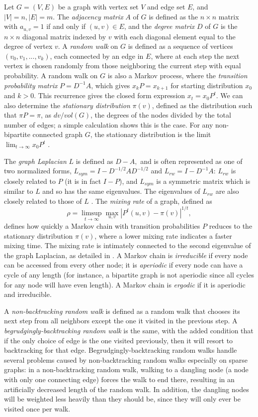 \documentclass{article} %
\begin{document}
Let $G = (V,E)$ be a graph with vertex set $V$ and edge set $E$, and $|V| = n, |E| = m$. The \emph{adjacency matrix} $A$ of $G$ is defined as the $n\times n$ matrix with $a_{u,v} = 1$ if and only if $(u,v)\in E$, and the \emph{degree matrix} $D$ of $G$ is the $n \times n$ diagonal matrix indexed by $v$ with each diagonal element equal to the degree of vertex $v$. A \emph{random walk} on $G$ is defined as a sequence of vertices $(v_0,v_1,...,v_k)$, each connected by an edge in $E$, where at each step the next vertex is chosen randomly from those neighboring the current step with equal probability. A random walk on $G$ is also a Markov process, where the \emph{transition probability matrix} $P = D^{-1}A$, which gives $x_kP = x_{k+1}$ for starting distribution $x_0$ and $k>0$. This recurrence gives the closed form expression $x_t = x_0P^t$. We can also determine the \emph{stationary distribution} $\pi(v)$, defined as the distribution such that $\pi P = \pi$, as $dv/vol(G)$, the degrees of the nodes divided by the total number of edges; a simple calculation shows this is the case. For any non-bipartite connected graph $G$, the stationary distribution is the limit $\displaystyle\lim_{t\rightarrow\infty}{x_0P^t}$ \cite{Lovasz}.

The \emph{graph Laplacian} $L$ is defined as $D - A,$ and is often represented as one of two normalized forms, $L_{sym} = I - D^{-1/2}AD^{-1/2}$ and $L_{rw} = I - D^{-1}A$: $L_{rw}$ is closely related to $P$ (it is in fact $I-P$), and $L_{sym}$ is a symmetric matrix which is similar to $L$ and so has the same eigenvalues. The eigenvalues of $L_{rw}$ are also closely related to those of $L$ \cite{Luxburg}. The \emph{mixing rate} of a graph, defined as 
$$\rho = \limsup_{t\rightarrow\infty}\max_{u,v}\left|P^{t}(u,v)-\pi(v)\right|^{1/t},$$ 
defines how quickly a Markov chain with transition probabilities $P$ reduces to the stationary distribution $\pi(v)$, where a lower mixing rate indicates a faster mixing time. The mixing rate is intimately connected to the second eigenvalue of the graph Laplacian, as detailed in \cite{Lovasz}. A Markov chain is \emph{irreducible} if every node can be accessed from every other node; it is \emph{aperiodic} if every node can have a cycle of any length (for instance, a bipartite graph is not aperiodic since all cycles for any node will have even length). A Markov chain is \emph{ergodic} if it is aperiodic and irreducible. 

A \emph{non-backtracking random walk} is defined as a random walk that chooses its next step from all neighbors except the one it visited in the previous step. A \emph{begrudgingly-backtracking random walk} is the same, with the added condition that if the only choice of edge is the one visited previously, then it will resort to backtracking for that edge. Begrudgingly-backtracking random walks handle several problems caused by non-backtracking random walks especially on sparse graphs: in a non-backtracking random walk, walking to a dangling node (a node with only one connecting edge) forces the walk to end there, resulting in an artificially decreased length of the random walk. In addition, the dangling nodes will be weighted less heavily than they should be, since they will only ever be visited once per walk.
\end{document}
